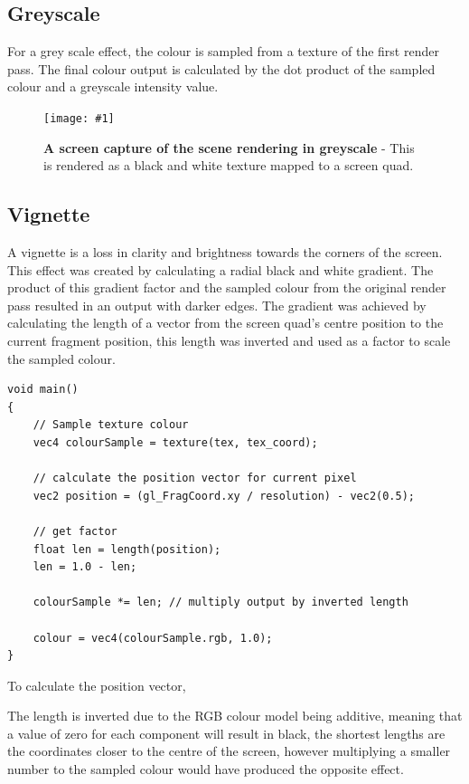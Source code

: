 \documentclass[conference]{acmsiggraph}
\newcommand{\figuremacroW}[4]{
\begin{figure}[h] %
	\centering
	\texttt{[image: \#1]}
	\caption[#2]{\textbf{#2} - #3}
	\label{fig:#1}
\end{figure}
}
\begin{document}
\subsection{Greyscale}
	
For a grey scale effect, the colour is sampled from a texture of the first render pass. The final colour output is calculated by the dot product of the sampled colour and a greyscale intensity value.
	
\figuremacroW
{greyscale}
{A screen capture of the scene rendering in greyscale}
{This is rendered as a black and white texture mapped to a screen quad.}
{1.0}
	
\subsection{Vignette}
	
A vignette is a loss in clarity and brightness towards the corners of the screen. This effect was created by calculating a radial black and white gradient. The product of this gradient factor and the sampled colour from the original render pass resulted in an output with darker edges. The gradient was achieved by calculating the length of a vector from the screen quad's centre position to the current fragment position, this length was inverted and used as a factor to scale the sampled colour. 
	
\begin{lstlisting}[label = {lst:vignette}, caption={Fragment Shader Code Snippet for Vignette Calculation}]
void main()
{
	// Sample texture colour
	vec4 colourSample = texture(tex, tex_coord);
	
	// calculate the position vector for current pixel
	vec2 position = (gl_FragCoord.xy / resolution) - vec2(0.5);
	
	// get factor
	float len = length(position);
	len = 1.0 - len;
	
	colourSample *= len; // multiply output by inverted length
	
	colour = vec4(colourSample.rgb, 1.0);
}
\end{lstlisting}
	
To calculate the position vector, %

The length is inverted due to the RGB colour model being additive, meaning that a value of zero for each component will result in black, the shortest lengths are the coordinates closer to the centre of the screen, however multiplying a smaller number to the sampled colour would have produced the opposite effect.
	
\end{document}
